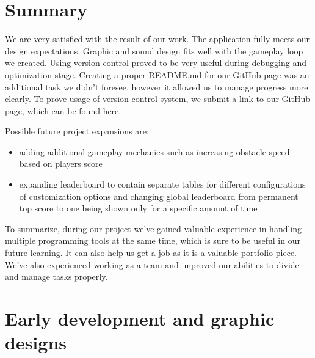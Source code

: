 \documentclass[oneside,a4paper,11pt]{report}
\begin{document}
\chapter{Summary}
We are very satisfied with the result of our work. The application fully meets our design expectations. Graphic and sound design fits well with the gameplay loop we created. Using version control proved to be very useful during debugging and optimization stage. Creating a proper README.md for our GitHub page was an additional task we didn't foresee, however it allowed us to manage progress more clearly. To prove usage of version control system, we submit a link to our GitHub page, which can be found \underline{\href{https://github.com/RadziooT/Cyberventure}{here}.}

\par
Possible future project expansions are:
\begin{itemize}
	\item adding additional gameplay mechanics such as increasing obstacle speed based on players score
	\item expanding leaderboard to contain separate tables for different configurations of customization options and changing global leaderboard from permanent top score to one being shown only for a specific amount of time
\end{itemize}

\par
To summarize, during our project we've gained valuable experience in handling multiple programming tools at the same time, which is sure to be useful in our future learning. It can also help us get a job as it is a valuable portfolio piece. We've also experienced working as a team and improved our abilities to divide and manage tasks properly.


\newpage
{}
{}



\newpage
{}

\appendix
\chapter{Early development and graphic designs}
\end{document}
